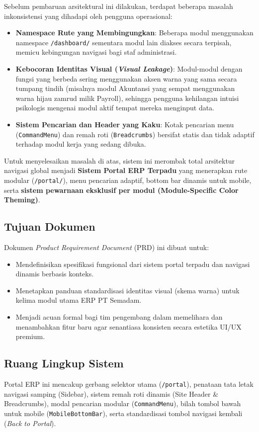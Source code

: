 \documentclass[11pt,a4paper]{article}
\begin{document}
Sebelum pembaruan arsitektural ini dilakukan, terdapat beberapa masalah inkonsistensi yang dihadapi oleh pengguna operasional:
\begin{itemize}
    \item \textbf{Namespace Rute yang Membingungkan}: Beberapa modul menggunakan namespace \texttt{/dashboard/} sementara modul lain diakses secara terpisah, memicu kebingungan navigasi bagi staf administrasi.
    \item \textbf{Kebocoran Identitas Visual (\textit{Visual Leakage})}: Modul-modul dengan fungsi yang berbeda sering menggunakan aksen warna yang sama secara tumpang tindih (misalnya modul Akuntansi yang sempat menggunakan warna hijau zamrud milik Payroll), sehingga pengguna kehilangan intuisi psikologis mengenai modul aktif tempat mereka menginput data.
    \item \textbf{Sistem Pencarian dan Header yang Kaku}: Kotak pencarian menu (\texttt{CommandMenu}) dan remah roti (\texttt{Breadcrumbs}) bersifat statis dan tidak adaptif terhadap modul kerja yang sedang dibuka.
\end{itemize}

Untuk menyelesaikan masalah di atas, sistem ini merombak total arsitektur navigasi global menjadi \textbf{Sistem Portal ERP Terpadu} yang menerapkan rute modular (\texttt{/portal/}), menu pencarian adaptif, bottom bar dinamis untuk mobile, serta \textbf{sistem pewarnaan eksklusif per modul (Module-Specific Color Theming)}.

\subsection{Tujuan Dokumen}
Dokumen \textit{Product Requirement Document} (PRD) ini dibuat untuk:
\begin{itemize}
    \item Mendefinisikan spesifikasi fungsional dari sistem portal terpadu dan navigasi dinamis berbasis konteks.
    \item Menetapkan panduan standardisasi identitas visual (skema warna) untuk kelima modul utama ERP PT Semadam.
    \item Menjadi acuan formal bagi tim pengembang dalam memelihara dan menambahkan fitur baru agar senantiasa konsisten secara estetika UI/UX premium.
\end{itemize}

\subsection{Ruang Lingkup Sistem}
Portal ERP ini mencakup gerbang selektor utama (\texttt{/portal}), penataan tata letak navigasi samping (Sidebar), sistem remah roti dinamis (Site Header \& Breadcrumbs), modal pencarian modular (\texttt{CommandMenu}), bilah tombol bawah untuk mobile (\texttt{MobileBottomBar}), serta standardisasi tombol navigasi kembali (\textit{Back to Portal}).
\end{document}
